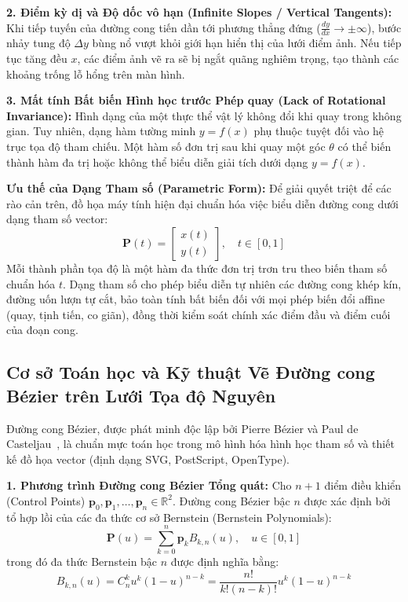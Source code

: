 \textbf{2. Điểm kỳ dị và Độ dốc vô hạn (Infinite Slopes / Vertical Tangents):}
Khi tiếp tuyến của đường cong tiến dần tới phương thẳng đứng ($\frac{dy}{dx} \to \pm \infty$), bước nhảy tung độ $\Delta y$ bùng nổ vượt khỏi giới hạn hiển thị của lưới điểm ảnh. Nếu tiếp tục tăng đều $x$, các điểm ảnh vẽ ra sẽ bị ngắt quãng nghiêm trọng, tạo thành các khoảng trống lỗ hổng trên màn hình.

\textbf{3. Mất tính Bất biến Hình học trước Phép quay (Lack of Rotational Invariance):}
Hình dạng của một thực thể vật lý không đổi khi quay trong không gian. Tuy nhiên, dạng hàm tường minh $y = f(x)$ phụ thuộc tuyệt đối vào hệ trục tọa độ tham chiếu. Một hàm số đơn trị sau khi quay một góc $\theta$ có thể biến thành hàm đa trị hoặc không thể biểu diễn giải tích dưới dạng $y = f(x)$.

\textbf{Ưu thế của Dạng Tham số (Parametric Form):}
Để giải quyết triệt để các rào cản trên, đồ họa máy tính hiện đại chuẩn hóa việc biểu diễn đường cong dưới dạng tham số vector:
\begin{equation}
\mathbf{P}(t) = \begin{bmatrix} x(t) \\ y(t) \end{bmatrix}, \quad t \in [0, 1]
\end{equation}
Mỗi thành phần tọa độ là một hàm đa thức đơn trị trơn tru theo biến tham số chuẩn hóa $t$. Dạng tham số cho phép biểu diễn tự nhiên các đường cong khép kín, đường uốn lượn tự cắt, bảo toàn tính bất biến đối với mọi phép biến đổi affine (quay, tịnh tiến, co giãn), đồng thời kiểm soát chính xác điểm đầu và điểm cuối của đoạn cong.

\subsection{Cơ sở Toán học và Kỹ thuật Vẽ Đường cong Bézier trên Lưới Tọa độ Nguyên}
\label{subsec:w5_bezier_grid}

Đường cong Bézier, được phát minh độc lập bởi Pierre Bézier và Paul de Casteljau~\citep{bezier1972numerical,decasteljau1959courbes}, là chuẩn mực toán học trong mô hình hóa hình học tham số và thiết kế đồ họa vector (định dạng SVG, PostScript, OpenType).

\textbf{1. Phương trình Đường cong Bézier Tổng quát:}
Cho $n+1$ điểm điều khiển (Control Points) $\mathbf{p}_0, \mathbf{p}_1, \dots, \mathbf{p}_n \in \mathbb{R}^2$. Đường cong Bézier bậc $n$ được xác định bởi tổ hợp lồi của các đa thức cơ sở Bernstein (Bernstein Polynomials):
\begin{equation}
\mathbf{P}(u) = \sum_{k=0}^n \mathbf{p}_k B_{k, n}(u), \quad u \in [0, 1]
\end{equation}
trong đó đa thức Bernstein bậc $n$ được định nghĩa bằng:
\begin{equation}
B_{k, n}(u) = C_n^k u^k (1 - u)^{n-k} = \frac{n!}{k!(n - k)!} u^k (1 - u)^{n-k}
\end{equation}

